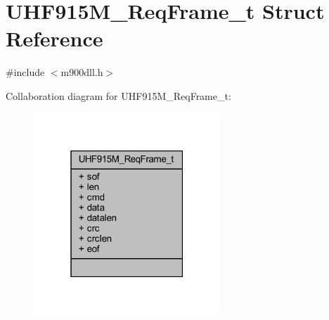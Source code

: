 \hypertarget{struct_u_h_f915_m___req_frame__t}{}\section{U\+H\+F915\+M\+\_\+\+Req\+Frame\+\_\+t Struct Reference}
\label{struct_u_h_f915_m___req_frame__t}


{\ttfamily \#include $<$m900dll.\+h$>$}



Collaboration diagram for U\+H\+F915\+M\+\_\+\+Req\+Frame\+\_\+t\+:
\nopagebreak
\begin{figure}[H]
\begin{center}
\leavevmode
\includegraphics[width=199pt]{struct_u_h_f915_m___req_frame__t__coll__graph}
\end{center}
\end{figure}

